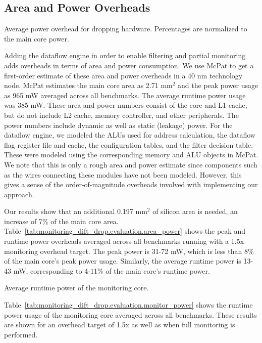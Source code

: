 \subsection{Area and Power Overheads}

\begin{table}[tb]
  \begin{center}
    \begin{footnotesize}
    
    \end{footnotesize}
    \caption{Average power overhead for dropping hardware. Percentages 
    are normalized to the main core power.}
    \label{tab:monitoring_dift_drop.evaluation.area_power}
  \end{center}
\end{table}

Adding the dataflow engine in order to enable filtering and partial monitoring
adds overheads in terms of area and power consumption. We use McPat
\cite{mcpat-micro09} to get a first-order estimate of these area and power
overheads in a 40 nm technology node. McPat estimates the main core area as
2.71 mm$^2$ and the peak power usage as 965 mW averaged across all benchmarks.
The average runtime power usage was 385 mW. These area and power numbers
consist of the core and L1 cache, but do not include L2 cache, memory
controller, and other peripherals. The power numbers include dynamic as well as
static (leakage) power. For the dataflow engine, we modeled the ALUs used for
address calculation, the dataflow flag register file and cache, the
configuration tables, and the filter decision table. These were modeled using
the corresponding memory and ALU objects in McPat. We note that this is only a
rough area and power estimate since components such as the wires connecting
these modules have not been modeled. However, this gives a sense of the
order-of-magnitude overheads involved with implementing our approach.

Our results show that an additional 0.197 mm$^2$ of silicon area is needed, an
increase of 7\% of the main core area.
Table~\ref{tab:monitoring_dift_drop.evaluation.area_power} shows the peak and
runtime power overheads averaged across all benchmarks running with a 1.5x
monitoring overhead target. The peak power is 31-72 mW, which is less than 8\%
of the main core's peak power usage. Similarly, the average runtime power is
13-43 mW, corresponding to 4-11\% of the main core's runtime power.

\begin{table}[tb]
  \begin{center}
    \begin{footnotesize}
    
    \end{footnotesize}
    \caption{Average runtime power of the monitoring core.}
    \label{tab:monitoring_dift_drop.evaluation.monitor_power}
  \end{center}
\end{table}

Table~\ref{tab:monitoring_dift_drop.evaluation.monitor_power} shows the runtime
power usage of the monitoring core averaged across all benchmarks. These
results are shown for an overhead target of 1.5x as well as when full
monitoring is performed.

